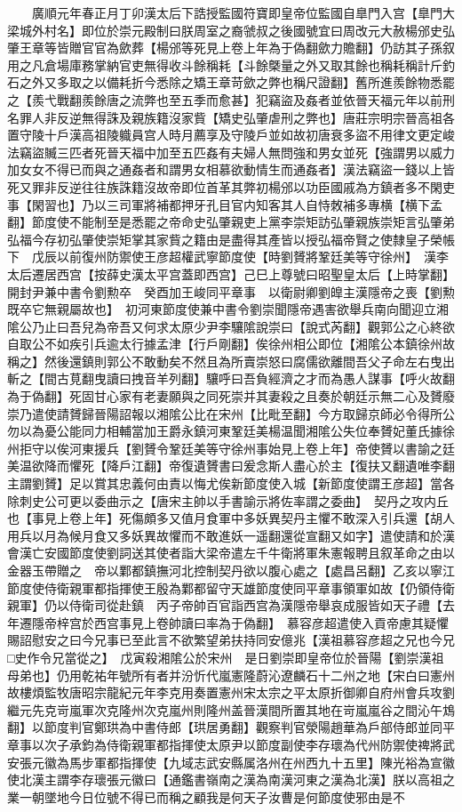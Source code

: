 　　廣順元年春正月丁卯漢太后下誥授監國符寶即皇帝位監國自臯門入宫【臯門大梁城外村名】即位於崇元殿制曰朕周室之裔虢叔之後國號宜曰周改元大赦楊邠史弘肇王章等皆贈官官為歛葬【楊邠等死見上卷上年為于偽翻歛力贍翻】仍訪其子孫叙用之凡倉場庫務掌納官吏無得收斗餘稱耗【斗餘槩量之外又取其餘也稱耗稱計斤釣石之外又多取之以備耗折今悉除之矯王章苛歛之弊也稱尺證翻】舊所進羨餘物悉罷之【羨弋戰翻羨餘唐之流弊也至五季而愈甚】犯竊盜及姦者並依晉天福元年以前刑名罪人非反逆無得誅及親族籍沒家貲【矯史弘肇虐刑之弊也】唐莊宗明宗晉高祖各置守陵十戶漢高祖陵軄員宫人時月薦享及守陵戶並如故初唐衰多盜不用律文更定峻法竊盜贓三匹者死晉天福中加至五匹姦有夫婦人無問強和男女並死【強謂男以威力加女女不得已而與之通姦者和謂男女相慕欲動情生而通姦者】漢法竊盜一錢以上皆死又罪非反逆往往族誅籍沒故帝即位首革其弊初楊邠以功臣國戚為方鎮者多不閑吏事【閑習也】乃以三司軍將補都押牙孔目官内知客其人自恃敇補多專横【横下孟翻】節度使不能制至是悉罷之帝命史弘肇親吏上黨李崇矩訪弘肇親族崇矩言弘肇弟弘福今存初弘肇使崇矩掌其家貲之籍由是盡得其產皆以授弘福帝賢之使隸皇子榮帳下　戊辰以前復州防禦使王彦超權武寧節度使【時劉贇將鞏廷美等守徐州】　漢李太后遷居西宫【按薛史漢太平宫蓋即西宫】己巳上尊號曰昭聖皇太后【上時掌翻】　開封尹兼中書令劉勲卒　癸酉加王峻同平章事　以衛尉卿劉皥主漢隱帝之喪【劉勲既卒它無親屬故也】　初河東節度使兼中書令劉崇聞隱帝遇害欲舉兵南向聞迎立湘隂公乃止曰吾兒為帝吾又何求太原少尹李驤隂說崇曰【說式芮翻】觀郭公之心終欲自取公不如疾引兵逾太行據孟津【行戶剛翻】俟徐州相公即位【湘隂公本鎮徐州故稱之】然後還鎮則郭公不敢動矣不然且為所賣崇怒曰腐儒欲離間吾父子命左右曳出斬之【間古莧翻曳讀曰拽音羊列翻】驤呼曰吾負經濟之才而為愚人謀事【呼火故翻為于偽翻】死固甘心家有老妻願與之同死崇并其妻殺之且奏於朝廷示無二心及贇廢崇乃遣使請贇歸晉陽詔報以湘隂公比在宋州【比毗至翻】今方取歸京師必令得所公勿以為憂公能同力相輔當加王爵永鎮河東鞏廷美楊温聞湘隂公失位奉贇妃董氏據徐州拒守以俟河東援兵【劉贇令鞏廷美等守徐州事始見上卷上年】帝使贇以書諭之廷美温欲降而懼死【降戶江翻】帝復遺贇書曰爰念斯人盡心於主【復扶又翻遺唯李翻主謂劉贇】足以賞其忠義何由責以悔尤俟新節度使入城【新節度使謂王彦超】當各除刺史公可更以委曲示之【唐宋主帥以手書諭示將佐率謂之委曲】　契丹之攻内丘也【事見上卷上年】死傷頗多又值月食軍中多妖異契丹主懼不敢深入引兵還【胡人用兵以月為候月食又多妖異故懼而不敢進妖一遥翻還從宣翻又如字】遣使請和於漢會漢亡安國節度使劉詞送其使者詣大梁帝遣左千牛衛將軍朱憲報聘且叙革命之由以金器玉帶贈之　帝以鄴都鎮撫河北控制契丹欲以腹心處之【處昌呂翻】乙亥以寧江節度使侍衛親軍都指揮使王殷為鄴都留守天雄節度使同平章事領軍如故【仍領侍衛親軍】仍以侍衛司從赴鎮　丙子帝帥百官詣西宫為漢隱帝舉哀成服皆如天子禮【去年遷隱帝梓宫於西宫事見上卷帥讀曰率為于偽翻】　慕容彦超遣使入貢帝慮其疑懼賜詔慰安之曰今兄事已至此言不欲繁望弟扶持同安億兆【漢祖慕容彦超之兄也今兄□史作令兄當從之】　戊寅殺湘隂公於宋州　是日劉崇即皇帝位於晉陽【劉崇漢祖母弟也】仍用乾祐年號所有者并汾忻代嵐憲隆蔚沁遼麟石十二州之地【宋白曰憲州故樓煩監牧唐昭宗龍紀元年李克用奏置憲州宋太宗之平太原折御卿自府州會兵攻劉繼元先克岢嵐軍次克隆州次克嵐州則隆州盖晉漢間所置其地在岢嵐嵐谷之間沁午鴆翻】以節度判官鄭珙為中書侍郎【珙居勇翻】觀察判官滎陽趙華為戶部侍郎並同平章事以次子承鈞為侍衛親軍都指揮使太原尹以節度副使李存瓌為代州防禦使禆將武安張元徽為馬步軍都指揮使【九域志武安縣属洛州在州西九十五里】陳光裕為宣徽使北漢主謂李存瓌張元徽曰【通鑑書嶺南之漢為南漢河東之漢為北漢】朕以高祖之業一朝墜地今日位號不得已而稱之顧我是何天子汝曹是何節度使邪由是不
